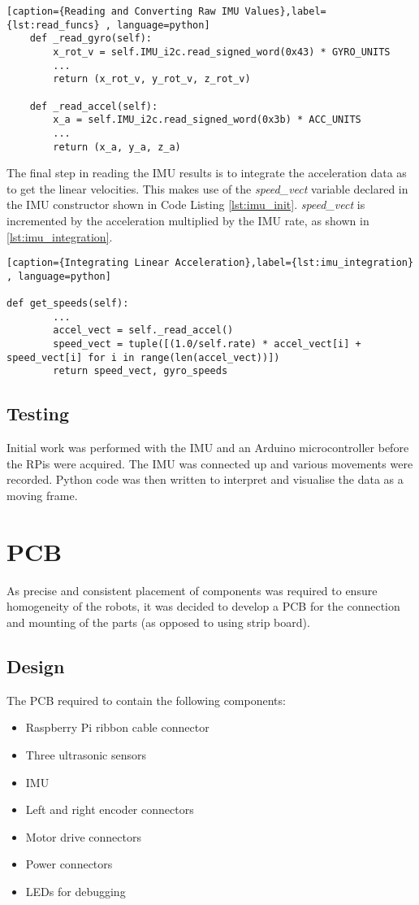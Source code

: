 \begin{lstlisting}[caption={Reading and Converting Raw IMU Values},label={lst:read_funcs} , language=python]
    def _read_gyro(self):
        x_rot_v = self.IMU_i2c.read_signed_word(0x43) * GYRO_UNITS
		...
        return (x_rot_v, y_rot_v, z_rot_v)

    def _read_accel(self):
        x_a = self.IMU_i2c.read_signed_word(0x3b) * ACC_UNITS
		...
        return (x_a, y_a, z_a)
\end{lstlisting}

The final step in reading the IMU results is to integrate the acceleration data as to get the linear velocities. This makes use of the \textit{speed\_vect} variable declared in the IMU constructor shown in Code Listing \ref{lst:imu_init}. \textit{speed\_vect} is incremented by the acceleration multiplied by the IMU rate, as shown in \ref{lst:imu_integration}.

\begin{lstlisting}[caption={Integrating Linear Acceleration},label={lst:imu_integration} , language=python]

def get_speeds(self):
		...
        accel_vect = self._read_accel()
        speed_vect = tuple([(1.0/self.rate) * accel_vect[i] + speed_vect[i] for i in range(len(accel_vect))])
        return speed_vect, gyro_speeds
\end{lstlisting}


\subsection{Testing}\label{elec/imu/test}
Initial work was performed with the IMU and an Arduino microcontroller before the RPis were acquired. The IMU was connected up and various movements were recorded. Python code was then written to interpret and visualise the data as a moving frame. 

\section{PCB}\label{elec/pcb}
As precise and consistent placement of components was required to ensure homogeneity of the robots, it was decided to develop a PCB for the connection and mounting of the parts (as opposed to using strip board).  
\subsection{Design}\label{elec/pcb/design}
The PCB required to contain the following components:
\begin{itemize}
  \item Raspberry Pi ribbon cable connector
  \item Three ultrasonic sensors
  \item IMU
  \item Left and right encoder connectors
  \item Motor drive connectors
  \item Power connectors
  \item LEDs for debugging
\end{itemize}

